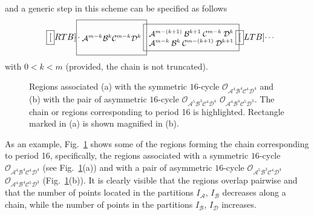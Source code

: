 \documentclass[10pt]{article}
\newif\ifFigs       \Figsfalse
\newcommand{\A}{{\mathcal A}}
\newcommand{\B}{{\mathcal B}}
\newcommand{\C}{{\mathcal C}}
\newcommand{\D}{{\mathcal D}}
\newcommand{\LC}{{\mathcal O}}
\newcommand{\Includegraphics}[2]%
           {\centering
             \ifFigs\texttt{[image: \#2]}%
             \else  \texttt{[image: \#2]}\fi}
\newcommand{\Includesubgraphics}[3]%
{\begin{minipage}[b]{#1}
    \Includegraphics{\textwidth}{#2}\\
    \centerline{{\footnotesize (#3)}}
  \end{minipage}
}
\begin{document}
and a generic step in this scheme can be specified as follows
\begin{equation}
	\fbox[RTB]{
		\begin{minipage}[c][2.5em][c]{1ex}\small
			\hspace*{-.7em}\dots
		\end{minipage}
	}
	\hspace*{-1ex}
	\fbox{
		\begin{minipage}[c][3.5em][c]{7em}\small\centering
			$\A^{m-k}\:\B^k\:\C^{m-k}\:\D^k$
		\end{minipage}
	}
	\hspace*{-1ex}
	\fbox{
		\begin{minipage}[c][2.5em][c]{10em}\small\centering
			$\A^{m-(k+1)}\:\B^{k+1}\:\C^{m-k}    \:\D^{k}$\\
			$\A^{m-k}   \:\B^{k}  \:\C^{m-(k+1)}\:\D^{k+1}$
		\end{minipage}
	}
	\hspace*{-1ex}
	\fbox[LTB]{
		\begin{minipage}[c][3.5em][c]{1ex}\small
			\dots
		\end{minipage}
	}
\end{equation}
with $0<k<m$ (provided, the chain is not truncated).


\begin{figure}[t]
	\caption{\label{fig:2D:blowup:symbolic}Regions associated (a) with
		the symmetric $16$-cycle $\LC_{\A^4\B^4\C^4\D^4}$ and (b) with the
		pair of asymmetric $16$-cycle $\LC_{\A^5\B^3\C^4\D^4}$
		$\LC_{\A^4\B^4\C^5\D^3}$. The chain or regions corresponding to
		period 16 is highlighted. Rectangle marked in (a) is shown
		magnified in (b).
	}
\end{figure}

As an example, Fig.~\ref{fig:2D:blowup:symbolic} shows some of the
regions forming the chain corresponding to period 16, specifically,
the regions associated with a symmetric $16$-cycle
$\LC_{\A^4\B^4\C^4\D^4}$ (see Fig.~\ref{fig:2D:blowup:symbolic}(a))
and with a pair of asymmetric $16$-cycle $\LC_{\A^5\B^3\C^4\D^4}$
$\LC_{\A^4\B^4\C^5\D^3}$ (Fig.~\ref{fig:2D:blowup:symbolic}(b)).  It
is clearly visible that the regions overlap pairwise and that the
number of points located in the partitions $I_\A$, $I_\B$ decreases
along a chain, while the number of points in the partitions $I_\B$,
$I_\D$ increases.
\end{document}

